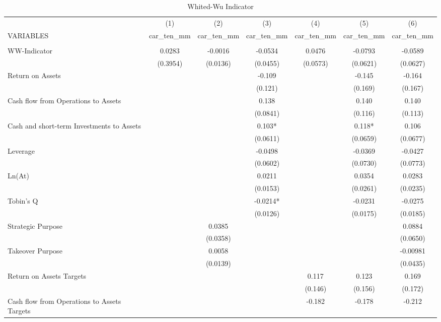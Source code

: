 \documentclass[12pt]{article}
\begin{document}
	\begin{table}[ht]
	\centering
	\caption{Whited-Wu Indicator}

	\begin{adjustbox}{height=10cm, max width=\textwidth}
		\begin{tabular}{lcccccc} \hline
			& (1) & (2) & (3) & (4) & (5) & (6) \\
		   VARIABLES & car\_ten\_mm & car\_ten\_mm & car\_ten\_mm & car\_ten\_mm & car\_ten\_mm & car\_ten\_mm \\ \hline
			&  &  &  &  &  &  \\
		   WW-Indicator & 0.0283 & -0.0016 & -0.0534 & 0.0476 & -0.0793 & -0.0589 \\
			& (0.3954) & (0.0136) & (0.0455) & (0.0573) & (0.0621) & (0.0627) \\
		   Return on Assets &  &  & -0.109 &  & -0.145 & -0.164 \\
			&  &  & (0.121) &  & (0.169) & (0.167) \\
		   Cash flow from Operations to Assets &  &  & 0.138 &  & 0.140 & 0.140 \\
			&  &  & (0.0841) &  & (0.116) & (0.113) \\
		   Cash and short-term Investments to Assets &  &  & 0.103* &  & 0.118* & 0.106 \\
			&  &  & (0.0611) &  & (0.0659) & (0.0677) \\
		   Leverage &  &  & -0.0498 &  & -0.0369 & -0.0427 \\
			&  &  & (0.0602) &  & (0.0730) & (0.0773) \\
		   Ln(At) &  &  & 0.0211 &  & 0.0354 & 0.0283 \\
			&  &  & (0.0153) &  & (0.0261) & (0.0235) \\
		   Tobin's Q &  &  & -0.0214* &  & -0.0231 & -0.0275 \\
			&  &  & (0.0126) &  & (0.0175) & (0.0185) \\
		   Strategic Purpose &  & 0.0385 &  &  &  & 0.0884 \\
			&  & (0.0358) &  &  &  & (0.0650) \\
		   Takeover Purpose &  & 0.0058 &  &  &  & -0.00981 \\
			&  & (0.0139) &  &  &  & (0.0435) \\
		   Return on Assets Targets &  &  &  & 0.117 & 0.123 & 0.169 \\
			&  &  &  & (0.146) & (0.156) & (0.172) \\
		   Cash flow from Operations to Assets Targets &  &  &  & -0.182 & -0.178 & -0.212 \\

\end{tabular}
\end{adjustbox}
\end{table}
\end{document}
